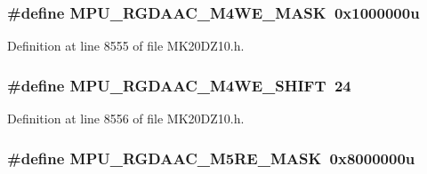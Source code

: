 \subsubsection[{\texorpdfstring{M\+P\+U\+\_\+\+R\+G\+D\+A\+A\+C\+\_\+\+M4\+W\+E\+\_\+\+M\+A\+SK}{MPU_RGDAAC_M4WE_MASK}}]{\setlength{\rightskip}{0pt plus 5cm}\#define M\+P\+U\+\_\+\+R\+G\+D\+A\+A\+C\+\_\+\+M4\+W\+E\+\_\+\+M\+A\+SK~0x1000000u}\hypertarget{group___m_p_u___register___masks_ga83e0fd88964bf881fff84ec5148be122}{}\label{group___m_p_u___register___masks_ga83e0fd88964bf881fff84ec5148be122}


Definition at line 8555 of file M\+K20\+D\+Z10.\+h.

\subsubsection[{\texorpdfstring{M\+P\+U\+\_\+\+R\+G\+D\+A\+A\+C\+\_\+\+M4\+W\+E\+\_\+\+S\+H\+I\+FT}{MPU_RGDAAC_M4WE_SHIFT}}]{\setlength{\rightskip}{0pt plus 5cm}\#define M\+P\+U\+\_\+\+R\+G\+D\+A\+A\+C\+\_\+\+M4\+W\+E\+\_\+\+S\+H\+I\+FT~24}\hypertarget{group___m_p_u___register___masks_gab956bade9f6a200c49007ae0385b5838}{}\label{group___m_p_u___register___masks_gab956bade9f6a200c49007ae0385b5838}


Definition at line 8556 of file M\+K20\+D\+Z10.\+h.

\subsubsection[{\texorpdfstring{M\+P\+U\+\_\+\+R\+G\+D\+A\+A\+C\+\_\+\+M5\+R\+E\+\_\+\+M\+A\+SK}{MPU_RGDAAC_M5RE_MASK}}]{\setlength{\rightskip}{0pt plus 5cm}\#define M\+P\+U\+\_\+\+R\+G\+D\+A\+A\+C\+\_\+\+M5\+R\+E\+\_\+\+M\+A\+SK~0x8000000u}\hypertarget{group___m_p_u___register___masks_ga96965e716b1fba479c7903a5ae64e305}{}\label{group___m_p_u___register___masks_ga96965e716b1fba479c7903a5ae64e305}


